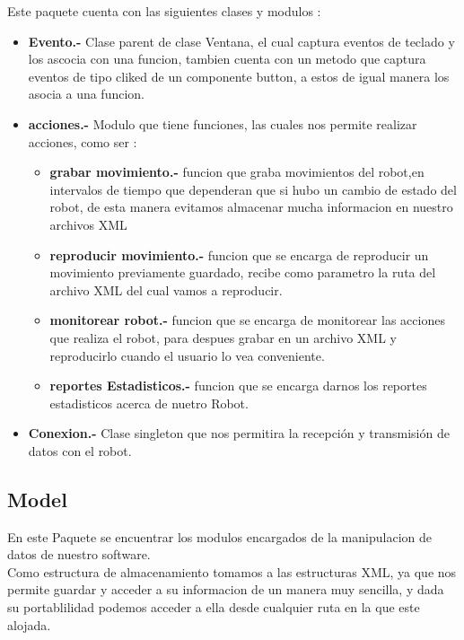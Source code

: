\documentclass[letterpaper,12pt]{article}
\begin{document}
{Este paquete cuenta con las siguientes clases y modulos :
	\begin{itemize}
		\item \textbf{Evento.- }Clase parent de clase Ventana, el cual captura eventos de teclado y los ascocia con una funcion, tambien cuenta con un metodo que captura eventos de tipo cliked de un componente button, a estos de igual manera los asocia a una funcion.
			
		\item \textbf{acciones.- } Modulo que tiene funciones, las cuales nos permite realizar acciones, como ser :
		\begin{itemize}
			\item \textbf{grabar movimiento.- }funcion que graba movimientos del robot,en intervalos de tiempo que dependeran que si hubo un cambio de estado del robot, de esta manera evitamos almacenar mucha informacion en nuestro archivos XML
			
			\item \textbf{reproducir movimiento.- }funcion que se encarga de reproducir un movimiento previamente guardado, recibe como parametro la ruta del archivo XML del cual vamos a reproducir.
							
			\item \textbf{monitorear robot.- }funcion que se encarga de monitorear las acciones que realiza el robot, para despues grabar en un archivo XML y reproducirlo cuando el usuario lo vea conveniente.
			
			\item \textbf{reportes Estadisticos.- }funcion que se encarga darnos los reportes estadisticos acerca de nuetro Robot.			
		\end{itemize}
		
		\item  \textbf{Conexion.- } Clase singleton que nos permitira la recepción y transmisión de datos con el robot.
		
		
	\end{itemize}

\subsection{Model}
En este Paquete se encuentrar los modulos encargados de la manipulacion de datos de nuestro software.\\
Como estructura de almacenamiento tomamos a las estructuras XML, ya que nos permite guardar y acceder a su informacion de un manera muy sencilla, y dada su portablilidad podemos acceder a ella desde cualquier ruta en la que este alojada.\\

}
\end{document}
